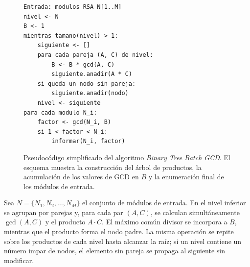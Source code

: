 \begin{figure}[H]
    \centering
    \begin{minipage}{0.76\textwidth}
\begin{Verbatim}[fontsize=\footnotesize, frame=single, framesep=2.5mm]
Entrada: modulos RSA N[1..M]
nivel <- N
B <- 1
mientras tamano(nivel) > 1:
    siguiente <- []
    para cada pareja (A, C) de nivel:
        B <- B * gcd(A, C)
        siguiente.anadir(A * C)
    si queda un nodo sin pareja:
        siguiente.anadir(nodo)
    nivel <- siguiente
para cada modulo N_i:
    factor <- gcd(N_i, B)
    si 1 < factor < N_i:
        informar(N_i, factor)
\end{Verbatim}
    \end{minipage}
    \caption{Pseudocódigo simplificado del algoritmo \textit{Binary Tree Batch GCD}. El esquema muestra la construcción del árbol de productos, la acumulación de los valores de GCD en \(B\) y la enumeración final de los módulos de entrada.}
    \label{fig:pseudocodigo_binary_tree}
\end{figure}

Sea \(N=\{N_1,N_2,\dots,N_M\}\) el conjunto de módulos de entrada. En el nivel inferior se agrupan por parejas y, para cada par \((A,C)\), se calculan simultáneamente \(\gcd(A,C)\) y el producto \(A\cdot C\). El máximo común divisor se incorpora a \(B\), mientras que el producto forma el nodo padre. La misma operación se repite sobre los productos de cada nivel hasta alcanzar la raíz; si un nivel contiene un número impar de nodos, el elemento sin pareja se propaga al siguiente sin modificar.

